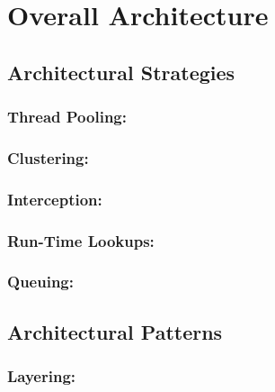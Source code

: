\documentclass[12pt]{article}
\begin{document}
\section{Overall Architecture}



	\subsection{Architectural Strategies}
	
	

	\subsubsection {Thread Pooling:} 


	\subsubsection {Clustering:} 


	\subsubsection{Interception:}
	

	\subsubsection {Run-Time Lookups:}


	\subsubsection {Queuing:}



	\subsection{Architectural Patterns}


	\subsubsection{Layering:} 
\end{document}
